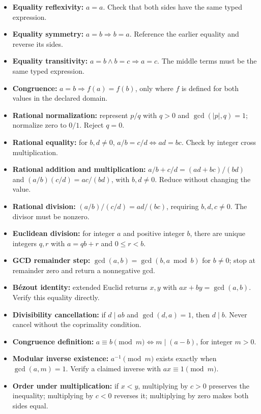 \documentclass[
  10pt,
]{article}
\providecommand{\tightlist}{%
  \setlength{\itemsep}{0pt}\setlength{\parskip}{0pt}}
\begin{document}
\begin{itemize}
\tightlist
\item
  \textbf{Equality reflexivity:} \(a=a\). Check that both sides have the
  same typed expression.
\item
  \textbf{Equality symmetry:} \(a=b\Rightarrow b=a\). Reference the
  earlier equality and reverse its sides.
\item
  \textbf{Equality transitivity:} \(a=b\land b=c\Rightarrow a=c\). The
  middle terms must be the same typed expression.
\item
  \textbf{Congruence:} \(a=b\Rightarrow f(a)=f(b)\), only where \(f\) is
  defined for both values in the declared domain.
\item
  \textbf{Rational normalization:} represent \(p/q\) with \(q>0\) and
  \(\gcd(|p|,q)=1\); normalize zero to \(0/1\). Reject \(q=0\).
\item
  \textbf{Rational equality:} for \(b,d\ne0\), \(a/b=c/d\iff ad=bc\).
  Check by integer cross multiplication.
\item
  \textbf{Rational addition and multiplication:}
  \(a/b+c/d=(ad+bc)/(bd)\) and \((a/b)(c/d)=ac/(bd)\), with \(b,d\ne0\).
  Reduce without changing the value.
\item
  \textbf{Rational division:} \((a/b)/(c/d)=ad/(bc)\), requiring
  \(b,d,c\ne0\). The divisor must be nonzero.
\item
  \textbf{Euclidean division:} for integer \(a\) and positive integer
  \(b\), there are unique integers \(q,r\) with \(a=qb+r\) and
  \(0\le r<b\).
\item
  \textbf{GCD remainder step:} \(\gcd(a,b)=\gcd(b,a\bmod b)\) for
  \(b\ne0\); stop at remainder zero and return a nonnegative gcd.
\item
  \textbf{Bézout identity:} extended Euclid returns \(x,y\) with
  \(ax+by=\gcd(a,b)\). Verify this equality directly.
\item
  \textbf{Divisibility cancellation:} if \(d\mid ab\) and
  \(\gcd(d,a)=1\), then \(d\mid b\). Never cancel without the
  coprimality condition.
\item
  \textbf{Congruence definition:} \(a\equiv b\pmod m\iff m\mid(a-b)\),
  for integer \(m>0\).
\item
  \textbf{Modular inverse existence:} \(a^{-1}\pmod m\) exists exactly
  when \(\gcd(a,m)=1\). Verify a claimed inverse with
  \(ax\equiv1\pmod m\).
\item
  \textbf{Order under multiplication:} if \(x<y\), multiplying by
  \(c>0\) preserves the inequality; multiplying by \(c<0\) reverses it;
  multiplying by zero makes both sides equal.
\end{itemize}
\end{document}
